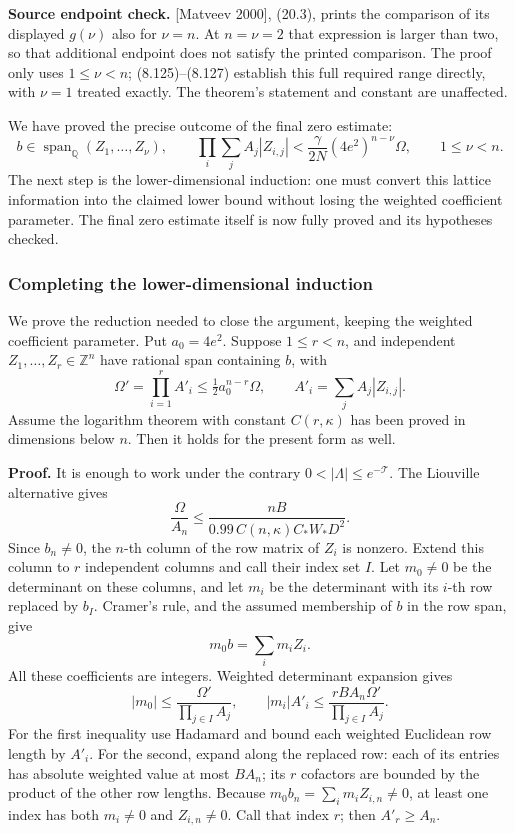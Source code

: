 \documentclass[
  11pt,
  a4paper,
]{article}
\begin{document}
\textbf{Source endpoint check.} {[}Matveev 2000{]}, (20.3), prints the
comparison of its displayed \(g(\nu)\) also for \(\nu=n\). At
\(n=\nu=2\) that expression is larger than two, so that additional
endpoint does not satisfy the printed comparison. The proof only uses
\(1\le\nu<n\); (8.125)--(8.127) establish this full required range
directly, with \(\nu=1\) treated exactly. The theorem's statement and
constant are unaffected.

We have proved the precise outcome of the final zero estimate: \[
b\in\operatorname{span}_{\mathbb Q}(Z_1,\ldots,Z_\nu),
\qquad
\prod_i\sum_j A_j|Z_{i,j}|
<
\frac{\gamma}{2N}(4e^2)^{n-\nu}\Omega,
\qquad 1\le\nu<n.
\tag{8.128}
\] The next step is the lower-dimensional induction: one must convert
this lattice information into the claimed lower bound without losing the
weighted coefficient parameter. The final zero estimate itself is now
fully proved and its hypotheses checked.

\subsubsection{Completing the lower-dimensional
induction}\label{completing-the-lower-dimensional-induction}

We prove the reduction needed to close the argument, keeping the
weighted coefficient parameter. Put \(a_0=4e^2\). Suppose \(1\le r<n\),
and independent \(Z_1,\ldots,Z_r\in\mathbb Z^n\) have rational span
containing \(b\), with \[
\Omega'=\prod_{i=1}^r A'_i
\le\tfrac12a_0^{n-r}\Omega,\qquad
A'_i=\sum_jA_j|Z_{i,j}|.
\tag{8.129}
\] Assume the logarithm theorem with constant \(C(r,\kappa)\) has been
proved in dimensions below \(n\). Then it holds for the present form as
well.

\textbf{Proof.} It is enough to work under the contrary
\(0<|\Lambda|\le e^{-\mathcal T}\). The Liouville alternative gives \[
\frac{\Omega}{A_n}
\le\frac{nB}{0.99\,C(n,\kappa)C_*W_*D^2}.
\] Since \(b_n\ne0\), the \(n\)-th column of the row matrix of \(Z_i\)
is nonzero. Extend this column to \(r\) independent columns and call
their index set \(I\). Let \(m_0\ne0\) be the determinant on these
columns, and let \(m_i\) be the determinant with its \(i\)-th row
replaced by \(b_I\). Cramer's rule, and the assumed membership of \(b\)
in the row span, give \[
m_0b=\sum_i m_iZ_i.
\] All these coefficients are integers. Weighted determinant expansion
gives \[
|m_0|\le\frac{\Omega'}{\prod_{j\in I}A_j},\qquad
|m_i|A'_i\le
\frac{rBA_n\Omega'}{\prod_{j\in I}A_j}.
\] For the first inequality use Hadamard and bound each weighted
Euclidean row length by \(A'_i\). For the second, expand along the
replaced row: each of its entries has absolute weighted value at most
\(BA_n\); its \(r\) cofactors are bounded by the product of the other
row lengths. Because \(m_0b_n=\sum_i m_iZ_{i,n}\ne0\), at least one
index has both \(m_i\ne0\) and \(Z_{i,n}\ne0\). Call that index \(r\);
then \(A'_r\ge A_n\).
\end{document}
